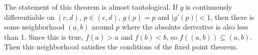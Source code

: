 The statement of this theorem is almost tautological. If $g$ is
continuously differentiable on $(c,d)$, $p \in (c,d)$, $g(p) = p$ and
$|g'(p)| < 1$, then there is some neighborhood $(a,b)$ around $p$ where
the absolute derivative is also less than 1.  Since this is true, $f(a)
> a$ and $f(b) < b$, so $f((a,b)) \subseteq (a,b)$.  Then this
neighborhood satisfies the conditions of the fixed point theorem.
